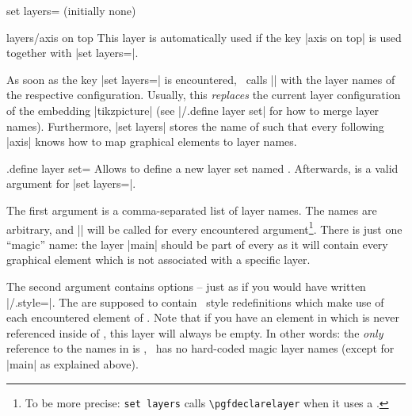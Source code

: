 {\begin{pgfplotskey}{set layers= (initially none)}
\begin{pgfplotskey}{layers/axis on top}
	This layer is automatically used if the key |axis on top| is used together with |set layers=|.
   \end{pgfplotskey}
  	
	As soon as the key |set layers=| is encountered, \PGFPlots\ calls |\pgfsetlayers| with the layer names of the respective configuration. Usually, this \emph{replaces} the current layer configuration of the embedding |tikzpicture| (see |/.define layer set| for how to merge layer names). Furthermore, |set layers| stores the name of  such that every following |axis| knows how to map graphical elements to layer names.
	
\end{pgfplotskey}



\begin{handler}{{.define layer set}=}
	Allows to define a new layer set named . Afterwards,  is a valid argument for |set layers=|.

	The first argument  is a comma-separated list of layer names. The names are arbitrary, and |\pgfdeclarelayer| will be called for every encountered argument\footnote{To be more precise: \texttt{set layers} calls \texttt{\textbackslash pgfdeclarelayer} when it uses a .}. There is just one ``magic'' name: the layer |main| should be part of every  as it will contain every graphical element which is not associated with a specific layer.

	The second argument  contains options -- just as if you would have written |/.style=|. The  are supposed to contain \PGFPlots\ style redefinitions which make use of each encountered element of . Note that if you have an element in  which is never referenced inside of , this layer will always be empty. In other words: the \emph{only} reference to the names in  is , \PGFPlots\ has no hard-coded magic layer names (except for |main| as explained above).


\end{handler}}
